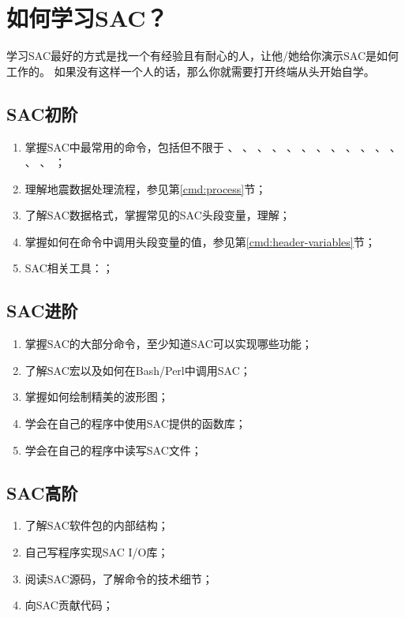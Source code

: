\section{如何学习SAC？}
学习SAC最好的方式是找一个有经验且有耐心的人，让他/她给你演示SAC是如何工作的。
如果没有这样一个人的话，那么你就需要打开终端从头开始自学。

\subsection{SAC初阶}
\begin{enumerate}
    \item 掌握SAC中最常用的命令，包括但不限于
            、
            、
            、
            、
            、
            、
            、
            、
            、
            、
            、
            、
            、
            、
            ；
        \item 理解地震数据处理流程，参见第\ref{cmd:process}节；
        \item 了解SAC数据格式，掌握常见的SAC头段变量，理解；
        \item 掌握如何在命令中调用头段变量的值，参见第\ref{cmd:header-variables}节；
        \item SAC相关工具：；
\end{enumerate}

\subsection{SAC进阶}
\begin{enumerate}
\item 掌握SAC的大部分命令，至少知道SAC可以实现哪些功能；
\item 了解SAC宏以及如何在Bash/Perl中调用SAC；
\item 掌握如何绘制精美的波形图；
\item 学会在自己的程序中使用SAC提供的函数库；
\item 学会在自己的程序中读写SAC文件；
\end{enumerate}

\subsection{SAC高阶}
\begin{enumerate}
\item 了解SAC软件包的内部结构；
\item 自己写程序实现SAC I/O库；
\item 阅读SAC源码，了解命令的技术细节；
\item 向SAC贡献代码；
\end{enumerate}
